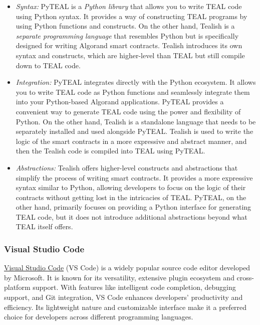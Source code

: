 \begin{itemize}
    \item \textit{Syntax:} PyTEAL is a \textit{Python library} that allows you to write TEAL code using Python syntax. It provides a way of constructing TEAL programs by using Python functions and constructs. On the other hand, Tealish is a \textit{separate programming language} that resembles Python but is specifically designed for writing Algorand smart contracts. Tealish introduces its own syntax and constructs, which are higher-level than TEAL but still compile down to TEAL code.
    \item \textit{Integration:} PyTEAL integrates directly with the Python ecosystem. It allows you to write TEAL code as Python functions and seamlessly integrate them into your Python-based Algorand applications. PyTEAL provides a convenient way to generate TEAL code using the power and flexibility of Python. On the other hand, Tealish is a standalone language that needs to be separately installed and used alongside PyTEAL. Tealish is used to write the logic of the smart contracts in a more expressive and abstract manner, and then the Tealish code is compiled into TEAL using PyTEAL.
    \item \textit{Abstractions:} Tealish offers higher-level constructs and abstractions that simplify the process of writing smart contracts. It provides a more expressive syntax similar to Python, allowing developers to focus on the logic of their contracts without getting lost in the intricacies of TEAL. PyTEAL, on the other hand, primarily focuses on providing a Python interface for generating TEAL code, but it does not introduce additional abstractions beyond what TEAL itself offers.
\end{itemize}


\subsubsection{Visual Studio Code}

\href{https://code.visualstudio.com}{Visual Studio Code} (VS Code) is a widely popular source code editor developed by Microsoft. It is known for its versatility, extensive plugin ecosystem and cross-platform support. With features like intelligent code completion, debugging support, and Git integration, VS Code enhances developers' productivity and efficiency. Its lightweight nature and customizable interface make it a preferred choice for developers across different programming languages.\newline

